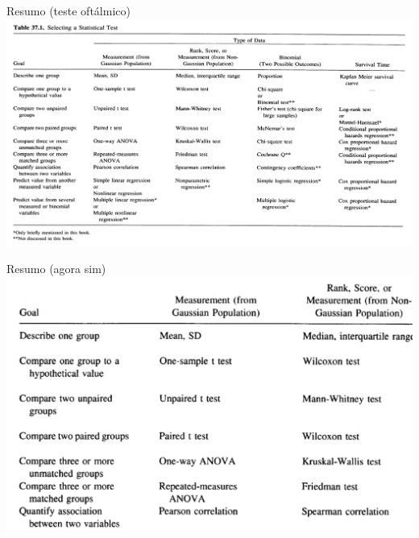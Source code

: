 \documentclass{beamer}
\begin{document}

\begin{frame}{\scriptsize Resumo (teste oftálmico)}
  \includegraphics[width=1.2\textwidth]{Cap37-38/metodos1}
\end{frame}

\begin{frame}{\scriptsize Resumo (agora sim)}
  \includegraphics[width=\textwidth]{Cap37-38/metodos2}
\end{frame}
\end{document}
